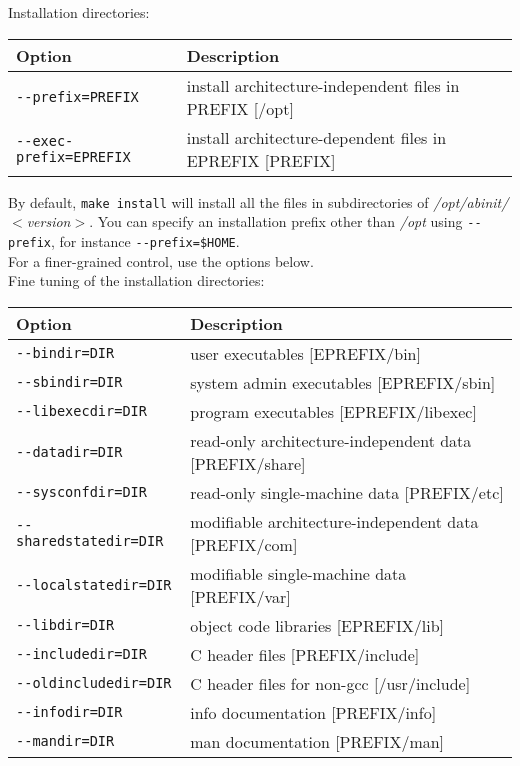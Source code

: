 Installation directories:

\begin{center}
\begin{tabular}{|l|p{9cm}|}
\hline
\textbf{Option} & \textbf{Description} \\
\hline
\texttt{-{-}prefix=PREFIX}       & install architecture-independent files in PREFIX
                         [/opt] \\
\texttt{-{-}exec-prefix=EPREFIX} & install architecture-dependent files in EPREFIX
                        [PREFIX] \\
\hline
\end{tabular}
\end{center}

By default, \texttt{make install} will install all the files in subdirectories
of \textit{/opt/abinit/$<$version$>$}.  You can specify an installation prefix
other than \textit{/opt} using \texttt{\hbox{-{-}prefix}}, for instance
\texttt{\hbox{-{-}prefix=\$HOME}}.
\\

For a finer-grained control, use the options below.
\\

Fine tuning of the installation directories:

\begin{center}
\begin{tabular}{|l|l|}
\hline
\textbf{Option} & \textbf{Description} \\
\hline
\texttt{-{-}bindir=DIR}         & user executables [EPREFIX/bin] \\
\texttt{-{-}sbindir=DIR}        & system admin executables [EPREFIX/sbin] \\
\texttt{-{-}libexecdir=DIR}     & program executables [EPREFIX/libexec] \\
\texttt{-{-}datadir=DIR}        & read-only architecture-independent data [PREFIX/share] \\
\texttt{-{-}sysconfdir=DIR}     & read-only single-machine data [PREFIX/etc] \\
\texttt{-{-}sharedstatedir=DIR} & modifiable architecture-independent data [PREFIX/com] \\
\texttt{-{-}localstatedir=DIR}  & modifiable single-machine data [PREFIX/var] \\
\texttt{-{-}libdir=DIR}         & object code libraries [EPREFIX/lib] \\
\texttt{-{-}includedir=DIR}     & C header files [PREFIX/include] \\
\texttt{-{-}oldincludedir=DIR}  & C header files for non-gcc [/usr/include] \\
\texttt{-{-}infodir=DIR}        & info documentation [PREFIX/info] \\
\texttt{-{-}mandir=DIR}         & man documentation [PREFIX/man] \\
\hline
\end{tabular}
\end{center}

